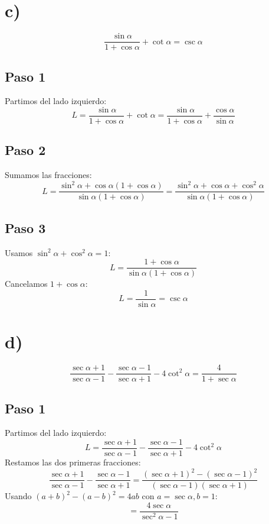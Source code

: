 \documentclass[12pt,a4paper]{article}
\begin{document}
\newpage
\section*{c)}

\begin{identidad}
\[
\frac{\sin\alpha}{1+\cos\alpha}
+
\cot\alpha
=
\csc\alpha
\]
\end{identidad}

\subsection*{Paso 1}
Partimos del lado izquierdo:
\[
L = \frac{\sin\alpha}{1+\cos\alpha} + \cot\alpha
= \frac{\sin\alpha}{1+\cos\alpha} + \frac{\cos\alpha}{\sin\alpha}
\]

\subsection*{Paso 2}
Sumamos las fracciones:
\[
L = \frac{\sin^2\alpha + \cos\alpha(1+\cos\alpha)}{\sin\alpha(1+\cos\alpha)}
= \frac{\sin^2\alpha + \cos\alpha + \cos^2\alpha}{\sin\alpha(1+\cos\alpha)}
\]

\subsection*{Paso 3}
Usamos \(\sin^2\alpha+\cos^2\alpha = 1\):
\[
L = \frac{1 + \cos\alpha}{\sin\alpha(1+\cos\alpha)}
\]
Cancelamos \(1+\cos\alpha\):
\[
L = \frac{1}{\sin\alpha} = \csc\alpha
\]

\newpage
\section*{d)}

\begin{identidad}
\[
\frac{\sec\alpha+1}{\sec\alpha-1}
-
\frac{\sec\alpha-1}{\sec\alpha+1}
-
4\cot^2\alpha
=
\frac4{1+\sec\alpha}
\]
\end{identidad}

\subsection*{Paso 1}
Partimos del lado izquierdo:
\[
L = \frac{\sec\alpha+1}{\sec\alpha-1} - \frac{\sec\alpha-1}{\sec\alpha+1} - 4\cot^2\alpha
\]
Restamos las dos primeras fracciones:
\[
\frac{\sec\alpha+1}{\sec\alpha-1} - \frac{\sec\alpha-1}{\sec\alpha+1}
= \frac{(\sec\alpha+1)^2 - (\sec\alpha-1)^2}{(\sec\alpha-1)(\sec\alpha+1)}
\]
Usando \((a+b)^2-(a-b)^2 = 4ab\) con \(a=\sec\alpha, b=1\):
\[
= \frac{4\sec\alpha}{\sec^2\alpha-1}
\]
\end{document}
